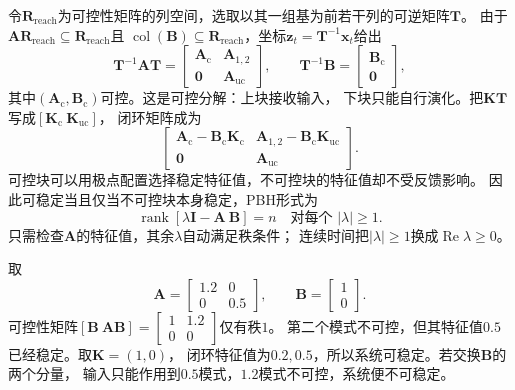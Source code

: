 令$\bm R_{\mathrm{reach}}$为可控性矩阵的列空间，选取以其一组基为前若干列的可逆矩阵$\bm T$。
由于$\bm A\bm R_{\mathrm{reach}}\subseteq\bm R_{\mathrm{reach}}$且
$\operatorname{col}(\bm B)\subseteq\bm R_{\mathrm{reach}}$，坐标$\bm z_t=\bm T^{-1}\bm x_t$给出
\[
  \bm T^{-1}\bm A\bm T=
  \begin{bmatrix}\bm A_{\mathrm c}&\bm A_{1,2}\\
                  \bm0&\bm A_{\mathrm{uc}}\end{bmatrix},
  \qquad
  \bm T^{-1}\bm B=\begin{bmatrix}\bm B_{\mathrm c}\\\bm0\end{bmatrix},
\]
其中$(\bm A_{\mathrm c},\bm B_{\mathrm c})$可控。这是可控分解：上块接收输入，
下块只能自行演化。把$\bm K\bm T$写成$[\bm K_{\mathrm c}\ \bm K_{\mathrm{uc}}]$，
闭环矩阵成为
\[
  \begin{bmatrix}
    \bm A_{\mathrm c}-\bm B_{\mathrm c}\bm K_{\mathrm c}
      &\bm A_{1,2}-\bm B_{\mathrm c}\bm K_{\mathrm{uc}}\\
    \bm0&\bm A_{\mathrm{uc}}
  \end{bmatrix}.
\]
可控块可以用极点配置选择稳定特征值，不可控块的特征值却不受反馈影响。
因此可稳定当且仅当不可控块本身稳定，PBH形式为
\begin{equation}
  \operatorname{rank}[\lambda\bm I-\bm A\ \bm B]=n
  \quad\text{对每个 }|\lambda|\geq1.
  \label{eq:control-pbh-stabilizability}
\end{equation}
只需检查$\bm A$的特征值，其余$\lambda$自动满足秩条件；
连续时间把$|\lambda|\geq1$换成$\operatorname{Re}\lambda\geq0$。

\begin{example}[不可控但可稳定的系统]
\label{ex:control-stabilizable-not-controllable}
取
\[
  \bm A=\begin{bmatrix}1.2&0\\0&0.5\end{bmatrix},
  \qquad \bm B=\begin{bmatrix}1\\0\end{bmatrix}.
\]
可控性矩阵$[\bm B\ \bm A\bm B]
=\left[\begin{smallmatrix}1&1.2\\0&0\end{smallmatrix}\right]$仅有秩$1$。
第二个模式不可控，但其特征值$0.5$已经稳定。取$\bm K=(1,0)$，
闭环特征值为$0.2,0.5$，所以系统可稳定。若交换$\bm B$的两个分量，
输入只能作用到$0.5$模式，$1.2$模式不可控，系统便不可稳定。
\end{example}

